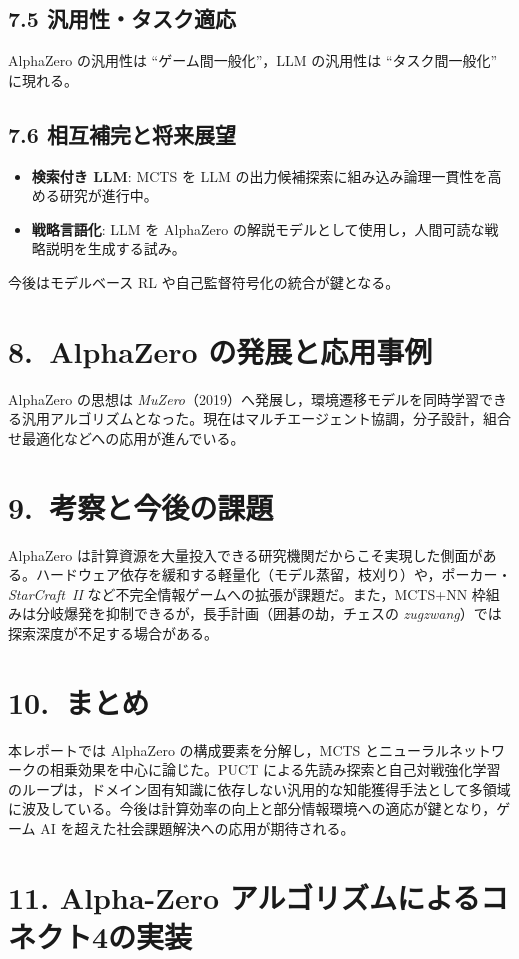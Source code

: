 \documentclass[a4paper,12pt]{article}
\begin{document}
\begin{CJK}{UTF8}{min}
\subsection*{7.5 汎用性・タスク適応}
AlphaZero の汎用性は ``ゲーム間一般化''，LLM の汎用性は ``タスク間一般化'' に現れる。

\subsection*{7.6 相互補完と将来展望}
\begin{itemize}
  \item \textbf{検索付き LLM}: MCTS を LLM の出力候補探索に組み込み論理一貫性を高める研究が進行中。
  \item \textbf{戦略言語化}: LLM を AlphaZero の解説モデルとして使用し，人間可読な戦略説明を生成する試み。
\end{itemize}
今後はモデルベース RL や自己監督符号化の統合が鍵となる。

\section*{8.~AlphaZero の発展と応用事例}
AlphaZero の思想は \textit{MuZero}（2019）へ発展し，環境遷移モデルを同時学習できる汎用アルゴリズムとなった。現在はマルチエージェント協調，分子設計，組合せ最適化などへの応用が進んでいる。

\section*{9.~考察と今後の課題}
AlphaZero は計算資源を大量投入できる研究機関だからこそ実現した側面がある。ハードウェア依存を緩和する軽量化（モデル蒸留，枝刈り）や，ポーカー・\textit{StarCraft~II} など不完全情報ゲームへの拡張が課題だ。また，MCTS+NN 枠組みは分岐爆発を抑制できるが，長手計画（囲碁の劫，チェスの \textit{zugzwang}）では探索深度が不足する場合がある。

\section*{10.~まとめ}
本レポートでは AlphaZero の構成要素を分解し，MCTS とニューラルネットワークの相乗効果を中心に論じた。PUCT による先読み探索と自己対戦強化学習のループは，ドメイン固有知識に依存しない汎用的な知能獲得手法として多領域に波及している。今後は計算効率の向上と部分情報環境への適応が鍵となり，ゲーム AI を超えた社会課題解決への応用が期待される。
\section*{11. Alpha-Zero アルゴリズムによるコネクト4の実装}
\label{sec:connect4-az}


\end{CJK}
\end{document}
